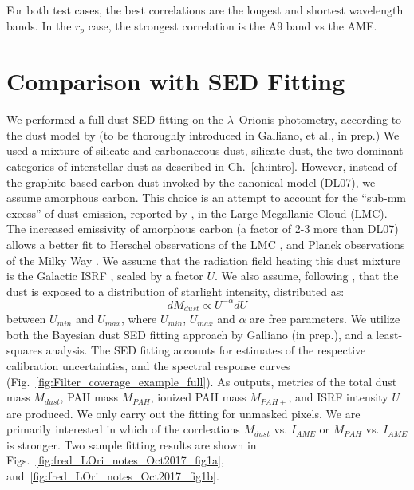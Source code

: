         For both test cases, the best correlations are the longest and shortest wavelength bands. In the $r_{p}$ case, the strongest correlation is the A9 band vs the AME.
        \section{Comparison with SED Fitting}
          We performed a full dust SED fitting on the $\lambda$~Orionis photometry, according to the dust model by \cite{galliano11} (to be thoroughly introduced in Galliano, et al., in prep.)  We used a mixture of silicate and carbonaceous dust, silicate dust, the two dominant categories of interstellar dust as described in Ch.~\ref{ch:intro}. However, instead of the graphite-based carbon dust invoked by the canonical \cite{draine07} model (DL07), we assume amorphous carbon. This choice is an attempt to account for the ``sub-mm excess'' of dust emission, reported by \cite{israel10, bot10}, in the Large Megallanic Cloud (LMC). The increased emissivity of amorphous carbon (a factor of 2-3 more than DL07) allows a better fit to Herschel observations of the LMC \citep{galliano11}, and Planck observations of the Milky Way \citep{planckIntXXIX16}. We assume that the radiation field heating this dust mixture is the Galactic ISRF \citep{mathis83}, scaled by a factor $U$. We also assume, following \cite{dale01}, that the dust is exposed to a distribution of starlight intensity, distributed as:
              \begin{equation}
                 \label{eq:U}
                   dM_{dust}\propto{} U^{-\alpha}dU
              \end{equation}
          between $U_{min}$ and $U_{max}$, where $U_{min}$, $U_{max}$ and $\alpha{}$ are free parameters.
          We utilize both the Bayesian dust SED fitting approach by Galliano (in prep.), and a least-squares analysis. The SED fitting accounts for estimates of the respective calibration uncertainties, and the spectral response curves (Fig.~\ref{fig:Filter_coverage_example_full}). As outputs, metrics of the total dust mass $M_{dust}$, PAH mass $M_{PAH}$, ionized PAH mass $M_{PAH+}$, and ISRF intensity $U$ are produced. We only carry out the fitting for unmasked pixels. We are primarily interested in which of the corrleations $M_{dust}$ vs. $I_{AME}$ or $M_{PAH}$ vs. $I_{AME}$ is stronger.
          Two sample fitting results are shown in Figs.~\ref{fig:fred_LOri_notes_Oct2017_fig1a}, and~\ref{fig:fred_LOri_notes_Oct2017_fig1b}.
